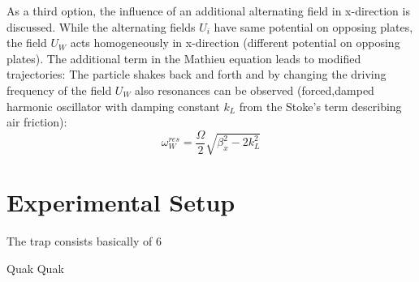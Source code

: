 \documentclass[
	paper=A4,
	parskip=full,
	chapterprefix=true,
	11pt,
	headings=normal,
	bibliography=totoc,
	listof=totoc,
	titlepage=on,
]{scrreprt}
\begin{document}
As a third option, the influence of an additional alternating field in x-direction is discussed. While the alternating fields $U_i$ have same potential on opposing plates, the field $U_W$ acts homogeneously in x-direction (different potential on opposing plates). The additional term in the Mathieu equation leads to modified trajectories: The particle shakes back and forth and by changing the driving frequency of the field $U_W$ also resonances can be observed (forced,damped harmonic oscillator with damping constant $k_L$ from the Stoke's term describing air friction):
\begin{equation}
\omega_W^{res} = \frac{\Omega}{2} \sqrt{\beta_x^2 - 2 k_L^2}
\end{equation}



\chapter{Experimental Setup}
The trap consists basically of 6 


Quak Quak

\cleardoublepage


{}
\end{document}
